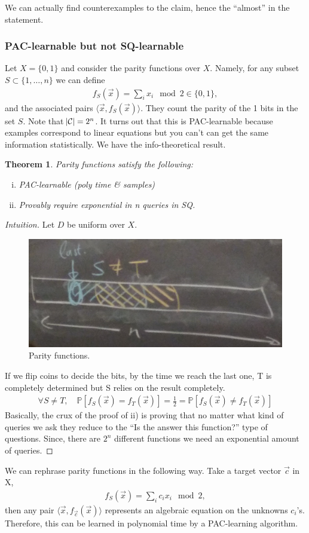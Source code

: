 \documentclass[12pt, letterpaper]{article}
\numberwithin{equation}{section} %
\newcommand{\mb}{\mathbb}
\newcommand{\mc}{\mathcal}
\newtheorem{theorem}{Theorem}[section]
\theoremstyle{definition}
\theoremstyle{remark}
\begin{document}
We can actually find counterexamples to the claim, hence the ``almost'' in the statement.
\subsubsection{PAC-learnable but not SQ-learnable}
Let $X=\lbrace 0,1 \rbrace$ and consider the parity functions over $X$. Namely, for any subset $S\subset \lbrace 1,\ldots, n\rbrace$ we can define
\begin{align}
f_S(\vec x) = \sum_ix_i \mod 2 \in \lbrace 0, 1\rbrace,
\end{align}
and the associated pairs $\langle \vec x, f_S(\vec x)\rangle$. They count the parity of the 1 bits in the set $S$. Note that $\abs{\mc C} = 2^n$. It turns out that this is PAC-learnable because examples correspond to linear equations but you can't can get the same information statistically. We have the info-theoretical result.
\begin{theorem}
Parity functions satisfy the following:
\begin{enumerate}[i)]
\item PAC-learnable (poly time \& samples)
\item Provably require exponential in n queries in SQ.
\end{enumerate}
\end{theorem}
\begin{proof}[Intuition]
Let $D$ be uniform over $X$.
\begin{figure}[H]
\centering
\includegraphics[width=0.6\linewidth]{../img/parity.jpg}
\caption{Parity functions.}
\end{figure}
If we flip coins to decide the bits, by the time we reach the last one, T is completely determined but S relies on the result completely. 
\begin{align}
\forall S\ne T,\quad\mb P[f_S(\vec x) = f_T(\vec x)] = \frac 12 = \mb P[f_S(\vec x) \ne f_T(\vec x)]
\end{align}
Basically, the crux of the proof of ii) is proving that no matter what kind of queries we ask they reduce to the ``Is the answer this function?'' type of questions. Since, there are $2^n$ different functions we need an exponential amount of queries.
\end{proof}
We can rephrase parity functions in the following way. Take a target vector $\vec c$ in X,
\begin{align}
f_S(\vec x) = \sum_ic_ix_i \mod 2,
\end{align}
then any pair  $\langle \vec x, f_{\vec c}(\vec x)\rangle$ represents an algebraic equation on the unknowns $c_i$'s. Therefore, this can be learned in polynomial time by a PAC-learning algorithm.
\end{document}
